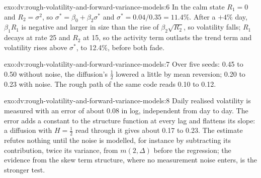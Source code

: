 \begin{solution}{exo:dv:rough-volatility-and-forward-variance-models:6}
In the calm state $R_1=0$ and $R_2=\sigma^2$, so $\sigma^*=\beta_0+\beta_2\sigma^*$ and $\sigma^*=0.04/0.35=11.4\%$.
After a $+4\%$ day, $\beta_1R_1$ is negative and larger in size than the rise of $\beta_2\sqrt{R_2}$, so
volatility falls; $R_1$ decays at rate 25 and $R_2$ at 15, so the activity term outlasts the trend term and
volatility rises above $\sigma^*$, to 12.4\%, before both fade.
\end{solution}

\begin{solution}{exo:dv:rough-volatility-and-forward-variance-models:7}
Over five seeds: 0.45 to 0.50 without noise, the diffusion's $\frac12$ lowered a little by mean reversion; 0.20
to 0.23 with noise. The rough path of the same code reads 0.10 to 0.12.
\end{solution}

\begin{solution}{exo:dv:rough-volatility-and-forward-variance-models:8}
Daily realised volatility is measured with an error of about 0.08 in log, independent from day to day. The error
adds a constant to the structure function at every lag and flattens its slope: a diffusion with $H=\frac12$
read through it gives about 0.17 to 0.23. The estimate refutes nothing until the noise is modelled, for instance by subtracting its contribution, twice
its variance, from $m(2,\Delta)$ before the regression; the evidence
from the skew term structure, where no measurement noise enters, is the stronger test.
\end{solution}

